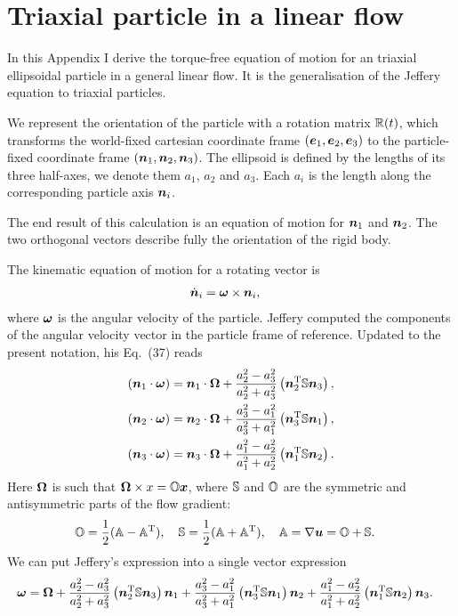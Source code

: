 \documentclass[thesis.tex]{subfiles}
\begin{document}
\chapter{Triaxial particle in a linear flow}

In this Appendix I derive the torque-free equation of motion for an triaxial ellipsoidal particle in a general linear flow. It is the generalisation of the Jeffery equation to triaxial particles. 

We represent the orientation of the particle with a rotation matrix $\mathbb{R}(t)$, which transforms the world-fixed cartesian coordinate frame $(\mbox{\boldmath$e$}_1, \mbox{\boldmath$e$}_2, \mbox{\boldmath$e$}_3)$ to the particle-fixed coordinate frame $(\mbox{\boldmath$n$}_1, \mbox{\boldmath$n$}_2, \mbox{\boldmath$n$}_3)$. The ellipsoid is defined by the lengths of its three half-axes, we denote them $a_1$, $a_2$ and $a_3$. Each $a_i$ is the length along the corresponding particle axis $\mbox{\boldmath$n$}_i$.

The end result of this calculation is an equation of motion for $\mbox{\boldmath$n$}_1$ and $\mbox{\boldmath$n$}_2$. The two orthogonal vectors describe fully the orientation of the rigid body.

The kinematic equation of motion for a rotating vector is 
\begin{align}
	\dot{\ve n}_i &= \ve \omega \cross \ve n_i,\eqnlab{tri01}
\end{align}
where $\mbox{\boldmath$\omega$}$ is the angular velocity of the particle.
Jeffery \cite{jeffery1922} computed the components of the angular velocity vector in the particle frame of reference. Updated to the present notation, his Eq.~(37) reads
\begin{align*}
	(\mbox{\boldmath$n$}_1 \cdot \mbox{\boldmath$\omega$}) &= \mbox{\boldmath$n$}_1\cdot \mbox{\boldmath$\Omega$} + \frac{a_2^2-a_3^2}{a_2^2+a_3^2}\left(\mbox{\boldmath$n$}_2^{\mathrm T} \mathbb{S}\mbox{\boldmath$n$}_3\right),\\
	(\mbox{\boldmath$n$}_2 \cdot \mbox{\boldmath$\omega$}) &= \mbox{\boldmath$n$}_2\cdot \mbox{\boldmath$\Omega$} + \frac{a_3^2-a_1^2}{a_3^2+a_1^2}\left(\mbox{\boldmath$n$}_3^{\mathrm T} \mathbb{S}\mbox{\boldmath$n$}_1\right),\\
	(\mbox{\boldmath$n$}_3 \cdot \mbox{\boldmath$\omega$}) &= \mbox{\boldmath$n$}_3\cdot \mbox{\boldmath$\Omega$} + \frac{a_1^2-a_2^2}{a_1^2+a_2^2}\left(\mbox{\boldmath$n$}_1^{\mathrm T} \mathbb{S}\mbox{\boldmath$n$}_2\right).
\end{align*}
Here $\mbox{\boldmath$\Omega$}$ is such that $\mbox{\boldmath$\Omega$} \times x = \mathbb{O}\mbox{\boldmath$x$}$, where $\mathbb{S}$ and $\mathbb{O}$ are the symmetric and antisymmetric parts of the flow gradient:
\begin{align*}
	&\mathbb{O} = \frac{1}{2}(\mathbb{A} - \mathbb{A}^{\mathrm T}),\quad
	\mathbb{S} = \frac{1}{2}(\mathbb{A} + \mathbb{A}^{\mathrm T}),\quad
	\mathbb{A} = \nabla \mbox{\boldmath$u$} = \mathbb{O} + \mathbb{S}.
\end{align*}
We can put Jeffery's expression into a single vector expression
\begin{align*}
	\mbox{\boldmath$\omega$} &= \mbox{\boldmath$\Omega$}
	 + \frac{a_2^2-a_3^2}{a_2^2+a_3^2}\left(\mbox{\boldmath$n$}_2^{\mathrm T} \mathbb{S}\mbox{\boldmath$n$}_3\right)\mbox{\boldmath$n$}_1
	 + \frac{a_3^2-a_1^2}{a_3^2+a_1^2}\left(\mbox{\boldmath$n$}_3^{\mathrm T} \mathbb{S}\mbox{\boldmath$n$}_1\right)\mbox{\boldmath$n$}_2
	  + \frac{a_1^2-a_2^2}{a_1^2+a_2^2}\left(\mbox{\boldmath$n$}_1^{\mathrm T} \mathbb{S}\mbox{\boldmath$n$}_2\right)\mbox{\boldmath$n$}_3.
\end{align*}
\end{document}
